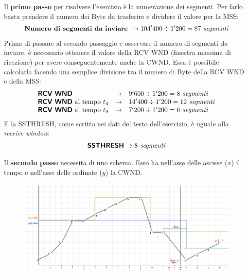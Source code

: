 \documentclass[a4paper]{article}
\begin{document}
	\noindent
	Il \textbf{primo passo} per risolvere l'esercizio è la numerazione dei segmenti. Per farlo basta prendere il numero dei Byte da trasferire e dividere il valore per la \textsf{MSS}:
	\begin{equation*}
		\textbf{Numero di segmenti da inviare } \rightarrow 104'400 \div 1'200 = 87 \emph{ segmenti}
	\end{equation*}
	Prima di passare al secondo passaggio e osservare il numero di segmenti da inviare, è necessario ottenere il valore della \textsf{RCV WND} (finestra massima di ricezione) per avere conseguentemente anche la \textsf{CWND}. Essa è possibile calcolarla facendo una semplice divisione tra il numero di Byte della \textsf{RCV WND} e della \textsf{MSS}:
	\begin{equation*}
		\begin{array}{lll}
			\textbf{\textsf{RCV WND}} & \rightarrow & 9'600 \div 1'200 = 8 \emph{ segmenti} \\
			\textbf{\textsf{RCV WND}}\text{ al tempo }t_{4} & \rightarrow & 14'400 \div 1'200 = 12 \emph{ segmenti} \\
			\textbf{\textsf{RCV WND}}\text{ al tempo }t_{9} & \rightarrow & 7'200 \div 1'200 = 6 \emph{ segmenti}
		\end{array}
	\end{equation*}
	E la \textsf{SSTHRESH}, come scritto nei dati del testo dell'esercizio, è uguale alla \emph{receive window}:
	\begin{equation*}
		\textsf{\textbf{SSTHRESH}} \rightarrow 8 \emph{ segmenti}
	\end{equation*}\newpage

	\noindent
	Il \textbf{secondo passo} necessita di uno schema. Esso ha nell’asse delle ascisse ($x$) il tempo e nell’asse delle ordinate ($y$) la \textsf{CWND}.
	\begin{figure}[!htp]
		\centering
		\includegraphics[width=\textwidth]{img/ex4_congestione.pdf}
	\end{figure}
\end{document}
